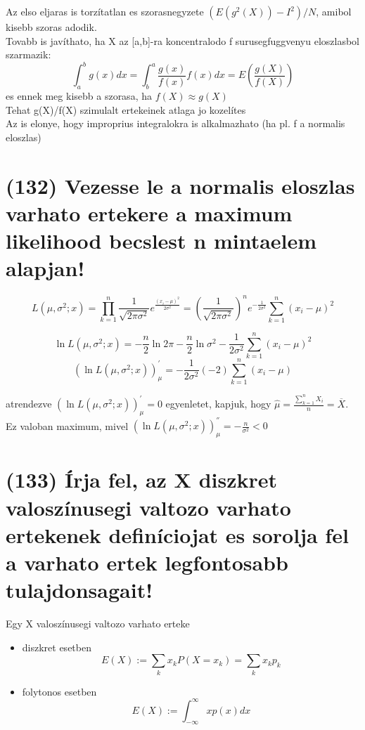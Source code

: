 \documentclass[12p]{article}
\begin{document}
Az elso eljaras is torzítatlan es szorasnegyzete $(E(g^2(X)) - I^2) / N$, amibol kisebb szoras adodik.\\
Tovabb is javíthato, ha X az [a,b]-ra koncentralodo f surusegfuggvenyu eloszlasbol szarmazik:
$$\int^b_a g(x)dx = \int^a_b \frac{g(x)}{f(x)} f(x)dx = E (\frac{g(X)}{f(X)})$$
es ennek meg kisebb a szorasa, ha $f(X) \approx g(X)$\\
Tehat g(X)/f(X) szimulalt ertekeinek atlaga jo kozelítes\\
Az is elonye, hogy improprius integralokra is alkalmazhato (ha pl. f a normalis eloszlas)

\section{(132) Vezesse le a normalis eloszlas varhato ertekere a maximum likelihood becslest n mintaelem alapjan!}

$$L(\mu, \sigma^2;x) 
= \prod^n_{k=1} \frac{1}{\sqrt{2\pi \sigma^2}} 
e^{\frac{(x_i-\mu)^2}{2\sigma^2}}
=\left(\frac{1}{\sqrt{2\pi \sigma^2}}\right)^n 
e^{-\frac{1}{2 \sigma^2}} \sum^n_{k=1} (x_i - \mu )^2$$

$$\ln L(\mu, \sigma^2;x) = - \frac{n}{2} \ln 2\pi - \frac{n}{2} \ln \sigma^2 - \frac{1}{2\sigma^2} \sum^n_{k=1} (x_i - \mu)^2$$
$$(\ln L(\mu,\sigma^2;x))^{'}_{\mu} = - \frac{1}{2\sigma^2}(-2)\sum^n_{k=1}(x_i - \mu)$$

atrendezve $(\ln L(\mu,\sigma^2;x))^{'}_{\mu} = 0$ egyenletet, kapjuk, hogy $\displaystyle{\hat{\mu} = \frac{\sum^n_{k=1} X_i}{n} = \overline{X}}$. Ez valoban maximum, mivel $(\ln L(\mu,\sigma^2;x))^{''}_{\mu} = -\frac{n}{\sigma^2} < 0$

\section{(133) Írja fel, az X diszkret valoszínusegi valtozo varhato ertekenek definíciojat es sorolja fel
a varhato ertek legfontosabb tulajdonsagait!}

Egy X valoszínusegi valtozo varhato erteke

\begin{itemize}
	\item diszkret esetben
		$$E(X) := \sum_k x_k P(X = x_k) = \sum_k x_k p_k$$
		
	\item folytonos esetben
		$$E(X) := \int_{-\infty}^\infty xp(x)dx$$
\end{itemize}
\end{document}
